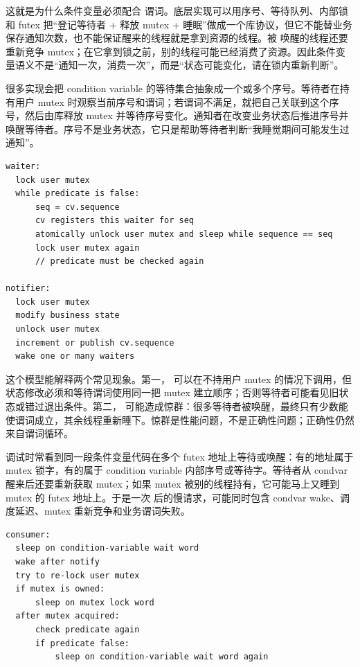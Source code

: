 这就是为什么条件变量必须配合  谓词。底层实现可以用序号、等待队列、内部锁和 futex 把“登记等待者 + 释放 mutex + 睡眠”做成一个库协议，但它不能替业务保存通知次数，也不能保证醒来的线程就是拿到资源的线程。被  唤醒的线程还要重新竞争 mutex；在它拿到锁之前，别的线程可能已经消费了资源。因此条件变量语义不是“通知一次，消费一次”，而是“状态可能变化，请在锁内重新判断”。

很多实现会把 condition variable 的等待集合抽象成一个或多个序号。等待者在持有用户 mutex 时观察当前序号和谓词；若谓词不满足，就把自己关联到这个序号，然后由库释放 mutex 并等待序号变化。通知者在改变业务状态后推进序号并唤醒等待者。序号不是业务状态，它只是帮助等待者判断“我睡觉期间可能发生过通知”。

\begin{lstlisting}[numbers=none,caption={用序号理解 condition variable}]
waiter:
  lock user mutex
  while predicate is false:
      seq = cv.sequence
      cv registers this waiter for seq
      atomically unlock user mutex and sleep while sequence == seq
      lock user mutex again
      // predicate must be checked again

notifier:
  lock user mutex
  modify business state
  unlock user mutex
  increment or publish cv.sequence
  wake one or many waiters
\end{lstlisting}

这个模型能解释两个常见现象。第一， 可以在不持用户 mutex 的情况下调用，但状态修改必须和等待谓词使用同一把 mutex 建立顺序；否则等待者可能看见旧状态或错过退出条件。第二， 可能造成惊群：很多等待者被唤醒，最终只有少数能使谓词成立，其余线程重新睡下。惊群是性能问题，不是正确性问题；正确性仍然来自谓词循环。

调试时常看到同一段条件变量代码在多个 futex 地址上等待或唤醒：有的地址属于 mutex 锁字，有的属于 condition variable 内部序号或等待字。等待者从 condvar 醒来后还要重新获取 mutex；如果 mutex 被别的线程持有，它可能马上又睡到 mutex 的 futex 地址上。于是一次  后的慢请求，可能同时包含 condvar wake、调度延迟、mutex 重新竞争和业务谓词失败。

\begin{lstlisting}[numbers=none,caption={一次条件变量唤醒可能经过多段等待}]
consumer:
  sleep on condition-variable wait word
  wake after notify
  try to re-lock user mutex
  if mutex is owned:
      sleep on mutex lock word
  after mutex acquired:
      check predicate again
      if predicate false:
          sleep on condition-variable wait word again
\end{lstlisting}

